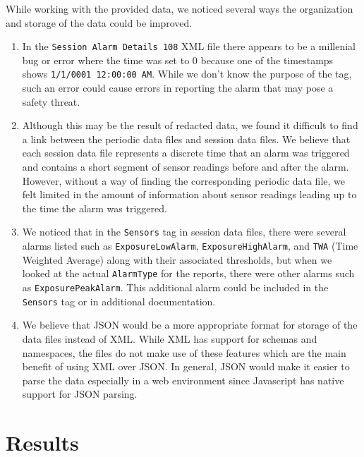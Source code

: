 \documentclass[twoside,twocolumn]{article}
\begin{document}
While working with the provided data, we noticed several ways the organization and storage of the data could be improved.
\begin{enumerate}[leftmargin=*]
\item In the \texttt{Session Alarm Details 108} XML file there appears to be a millenial bug or error where the time was set to 0 because one of the timestamps shows \texttt{1/1/0001 12:00:00 AM}. While we don't know the purpose of the tag, such an error could cause errors in reporting the alarm that may pose a safety threat.
\item Although this may be the result of redacted data, we found it difficult to find a link between the periodic data files and session data files. We believe that each session data file represents a discrete time that an alarm was triggered and contains a short segment of sensor readings before and after the alarm. However, without a way of finding the corresponding periodic data file, we felt limited in the amount of information about sensor readings leading up to the time the alarm was triggered.
\item We noticed that in the \texttt{Sensors} tag in session data files, there were several alarms listed such as \texttt{ExposureLowAlarm}, \texttt{ExposureHighAlarm}, and \texttt{TWA} (Time Weighted Average) along with their associated thresholds, but when we looked at the actual \texttt{AlarmType} for the reports, there were other alarms such as \texttt{ExposurePeakAlarm}. This additional alarm could be included in the \texttt{Sensors} tag or in additional documentation.
\item We believe that JSON would be a more appropriate format for storage of the data files instead of XML. While XML has support for schemas and namespaces, the files do  not make use of these features which are the main benefit of using XML over JSON. In general, JSON would make it easier to parse the data especially in a web environment since Javascript has native support for JSON parsing.
\end{enumerate}


\section{Results}
\end{document}
